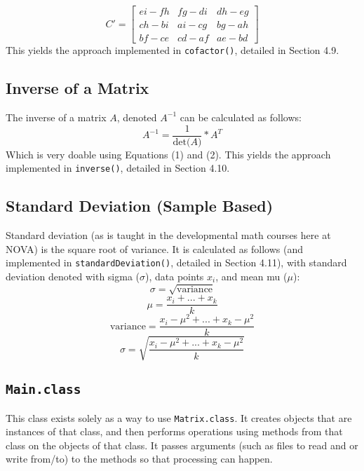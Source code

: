 \documentclass[12pt]{article}
\begin{document}
\begin{equation}
C' =
    \begin{bmatrix}
    e i - f h & f g - d i & d h - e g \\
    c h - b i & a i - c g & b g - a h \\
    b f - c e & c d - a f & a e - b d
\end{bmatrix}
\end{equation}
This yields the approach implemented in \texttt{cofactor()}, detailed in Section 4.9.

\subsection{Inverse of a Matrix}
The inverse of a matrix $A$, denoted $A^{-1}$ can be calculated as follows:
\begin{equation}
    A^{-1} = \frac{1}{\text{det($A$)}} * A^T
\end{equation}
Which is very doable using Equations (1) and (2). This yields the approach implemented in \texttt{inverse()}, detailed in Section 4.10.

\subsection{Standard Deviation (Sample Based)}
Standard deviation (as is taught in the developmental math courses here at NOVA) is the square root of variance. It is calculated as follows (and implemented in \texttt{standardDeviation()}, detailed in Section 4.11), with standard deviation denoted with sigma ($\sigma$), data points $x_i$, and mean mu ($\mu$):
\begin{equation*}
    \sigma = \sqrt{\text{variance}}
\end{equation*}
\begin{equation*}
    \mu = \frac{x_i + ... + x_k}{k}
\end{equation*}
\begin{equation*}
    \text{variance} = \frac{{x_i - \mu}^2 + ... + {x_k - \mu}^2}{k}
\end{equation*}
\begin{equation}
    \sigma = \sqrt{\frac{{x_i - \mu}^2 + ... + {x_k - \mu}^2}{k}}
\end{equation}



\newpage %



\begin{center}
\section{\texttt{Main.class}}
\end{center}
This class exists solely as a way to use \texttt{Matrix.class}. It creates objects that are instances of that class, and then performs operations using methods from that class on the objects of that class. It passes arguments (such as files to read and or write from/to) to the methods so that processing can happen.
\end{document}
